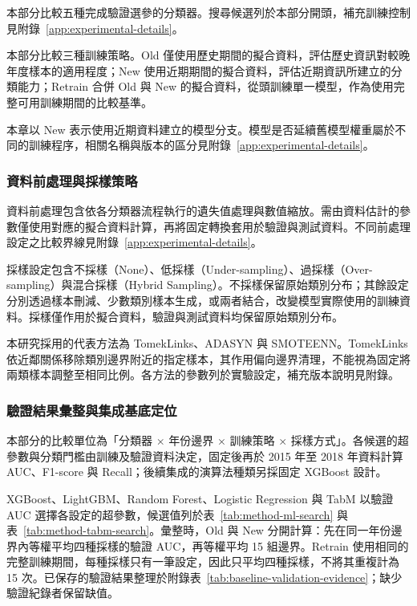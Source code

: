 本部分比較五種完成驗證選參的分類器。搜尋候選列於本部分開頭，補充訓練控制見附錄~\ref{app:experimental-details}。

本部分比較三種訓練策略。Old 僅使用歷史期間的擬合資料，評估歷史資訊對較晚年度樣本的適用程度；New 使用近期期間的擬合資料，評估近期資訊所建立的分類能力；Retrain 合併 Old 與 New 的擬合資料，從頭訓練單一模型，作為使用完整可用訓練期間的比較基準。

本章以 New 表示使用近期資料建立的模型分支。模型是否延續舊模型權重屬於不同的訓練程序，相關名稱與版本的區分見附錄~\ref{app:experimental-details}。

\subsubsection{資料前處理與採樣策略}

資料前處理包含依各分類器流程執行的遺失值處理與數值縮放。需由資料估計的參數僅使用對應的擬合資料計算，再將固定轉換套用於驗證與測試資料。不同前處理設定之比較界線見附錄~\ref{app:experimental-details}。

採樣設定包含不採樣（None）、低採樣（Under-sampling）、過採樣（Over-sampling）與混合採樣（Hybrid Sampling）。不採樣保留原始類別分布；其餘設定分別透過樣本刪減、少數類別樣本生成，或兩者結合，改變模型實際使用的訓練資料。採樣僅作用於擬合資料，驗證與測試資料均保留原始類別分布。

本研究採用的代表方法為 TomekLinks、ADASYN 與 SMOTEENN。TomekLinks 依近鄰關係移除類別邊界附近的指定樣本，其作用偏向邊界清理，不能視為固定將兩類樣本調整至相同比例。各方法的參數列於實驗設定，補充版本說明見附錄。

\subsubsection{驗證結果彙整與集成基底定位}

本部分的比較單位為「分類器 \ensuremath{\times} 年份邊界 \ensuremath{\times} 訓練策略 \ensuremath{\times} 採樣方式」。各候選的超參數與分類門檻由訓練及驗證資料決定，固定後再於 2015 年至 2018 年資料計算 AUC、F1-score 與 Recall；後續集成的演算法種類另採固定 XGBoost 設計。

XGBoost、LightGBM、Random Forest、Logistic Regression 與 TabM 以驗證 AUC 選擇各設定的超參數，候選值列於表~\ref{tab:method-ml-search} 與表~\ref{tab:method-tabm-search}。彙整時，Old 與 New 分開計算：先在同一年份邊界內等權平均四種採樣的驗證 AUC，再等權平均 15 組邊界。Retrain 使用相同的完整訓練期間，每種採樣只有一筆設定，因此只平均四種採樣，不將其重複計為 15 次。已保存的驗證結果整理於附錄表~\ref{tab:baseline-validation-evidence}；缺少驗證紀錄者保留缺值。


